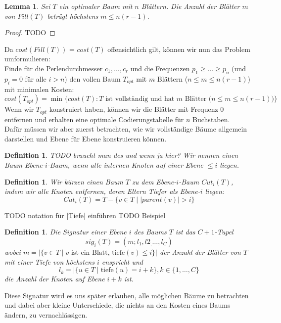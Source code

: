\documentclass[a4paper,10pt,ngerman]{scrartcl}
\newtheorem{definition}[satz]{Definition}
\newtheorem{lemma}[satz]{Lemma}
\begin{document}
    \begin{lemma}
        Sei $T$ ein optimaler Baum mit $n$ Blättern. Die Anzahl der Blätter $m$ von $Fill(T)$ beträgt höchstens $m \le n(r-1)$.
    \end{lemma}
    \begin{proof}
        TODO
    \end{proof}
    Da $cost(Fill(T))$ = $cost(T)$ offensichtlich gilt, können wir nun das Problem umformulieren:\\
    Finde für die Perlendurchmesser $c_1, \dots, c_r$ und die Frequenzen $p_1 \ge \dots \ge p_n$ (und $p_i = 0$ für alle $i > n$) den vollen Baum $T_{opt}$ mit $m$ Blättern ($n \le m \le n(r - 1)$) mit minimalen Kosten:
    \[cost(T_{opt}) = \min \{cost(T) : T \text{ ist vollständig und hat $m$ Blätter ($n \le m \le n(r - 1)$)}\}\]
    Wenn wir $T_{opt}$ konstruiert haben, können wir die Blätter mit Frequenz 0 entfernen und erhalten eine optimale Codierungstabelle für $n$ Buchstaben. \\
    Dafür müssen wir aber zuerst betrachten, wie wir vollständige Bäume allgemein darstellen und Ebene für Ebene konstruieren können.

    \begin{definition}
        TODO braucht man des und wenn ja hier?
        Wir nennen einen Baum Ebene-$i$-Baum, wenn alle internen Knoten auf einer Ebene $\le i$ liegen. \\
    \end{definition}
    \begin{definition}
        Wir kürzen einen Baum $T$ zu dem Ebene-$i$-Baum $Cut_i(T)$, indem wir alle Knoten entfernen, deren Eltern Tiefer als Ebene-$i$ liegen: \[Cut_i(T) = T - \{v \in T \mid |parent(v)| > i\}\]
    \end{definition}
    TODO notation für |Tiefe| einführen
    TODO Beispiel

    \begin{definition}
        Die Signatur einer Ebene $i$ des Baums $T$ ist das $C + 1$-Tupel \[sig_i(T) = (m;l_1,l2_, \dots, l_C)\]
        wobei $m = |\{v \in T \mid v \text{ ist ein Blatt, tiefe} (v) \le i\}|$ der Anzahl der Blätter von $T$ mit einer Tiefe von höchstens $i$ enspricht und
        \[l_k = |\{u \in T \mid \text{tiefe}(u) = i + k\}, k \in \{1,\dots,C\}\]
        die Anzahl der Knoten auf Ebene $i + k$ ist.
    \end{definition}
    Diese Signatur wird es uns später erlauben, alle möglichen Bäume zu betrachten und dabei aber kleine Unterschiede, die nichts an den Kosten eines Baums ändern, zu vernachlässigen.
\end{document}
